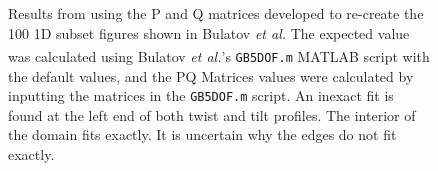 \documentclass[12pt]{report}
\begin{document}
\begin{figure}[ht!]
 \centering
 \quad
 \quad
 \caption{\label{fig:reproduceBulatov111} Results from using the P and Q matrices developed to re-create the \textlangle{}100\textrangle{} 1D subset figures shown in Bulatov \emph{et al.}  The expected value was calculated using Bulatov \emph{et al.}'s \lstinline!GB5DOF.m! MATLAB\textsuperscript{\textregistered} script with the default values, and the PQ Matrices values were calculated by inputting the matrices in the \lstinline!GB5DOF.m! script.  An inexact fit is found at the left end of both twist \protect{} and tilt \protect{} profiles.  The interior of the domain fits exactly.  It is uncertain why the edges do not fit exactly.}
\end{figure}
\end{document}
